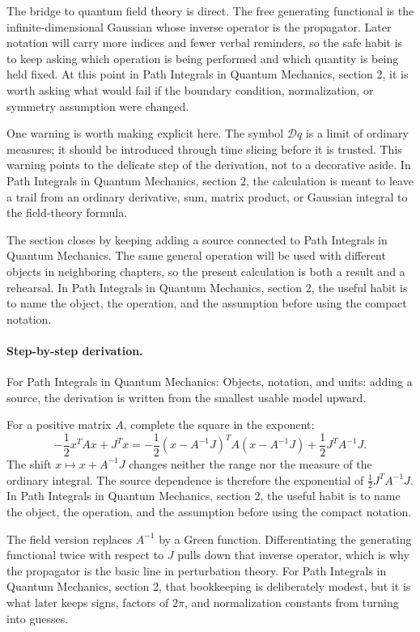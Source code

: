 The bridge to quantum field theory is direct.  The free generating functional is the infinite-dimensional Gaussian whose inverse operator is the propagator.  Later notation will carry more indices and fewer verbal reminders, so the safe habit is to keep asking which operation is being performed and which quantity is being held fixed.  At this point in Path Integrals in Quantum Mechanics, section 2, it is worth asking what would fail if the boundary condition, normalization, or symmetry assumption were changed.

One warning is worth making explicit here.  The symbol \(\mathcal D q\) is a limit of ordinary measures; it should be introduced through time slicing before it is trusted.  This warning points to the delicate step of the derivation, not to a decorative aside.  In Path Integrals in Quantum Mechanics, section 2, the calculation is meant to leave a trail from an ordinary derivative, sum, matrix product, or Gaussian integral to the field-theory formula.

The section closes by keeping adding a source connected to Path Integrals in Quantum Mechanics.  The same general operation will be used with different objects in neighboring chapters, so the present calculation is both a result and a rehearsal.  In Path Integrals in Quantum Mechanics, section 2, the useful habit is to name the object, the operation, and the assumption before using the compact notation.



\paragraph{Step-by-step derivation.}

For Path Integrals in Quantum Mechanics: Objects, notation, and units: adding a source, the derivation is written from the smallest usable model upward.

For a positive matrix \(A\), complete the square in the exponent:
\[
  -\frac12x^TAx+J^Tx
  =
  -\frac12(x-A^{-1}J)^TA(x-A^{-1}J)
  +\frac12J^TA^{-1}J.
\]
The shift \(x\mapsto x+A^{-1}J\) changes neither the range nor the measure of the ordinary integral.  The source dependence is therefore the exponential of \(\frac12J^TA^{-1}J\).  In Path Integrals in Quantum Mechanics, section 2, the useful habit is to name the object, the operation, and the assumption before using the compact notation.

The field version replaces \(A^{-1}\) by a Green function.  Differentiating the generating functional twice with respect to \(J\) pulls down that inverse operator, which is why the propagator is the basic line in perturbation theory.  For Path Integrals in Quantum Mechanics, section 2, that bookkeeping is deliberately modest, but it is what later keeps signs, factors of \(2\pi\), and normalization constants from turning into guesses.

